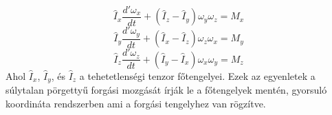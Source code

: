 \documentclass[../main.tex]{subfiles}
\begin{document}
\begin{equation}
    \hat{I}_x \frac{d'\omega_x}{dt} + (\hat{I}_z - \hat{I}_y) \omega_y \omega_z = M_x
\end{equation}
\begin{equation}
    \hat{I}_y \frac{d'\omega_y}{dt} + (\hat{I}_x - \hat{I}_z) \omega_z \omega_x = M_y
\end{equation}
\begin{equation}
    \hat{I}_z \frac{d'\omega_z}{dt} + (\hat{I}_y - \hat{I}_x) \omega_x \omega_y = M_z
\end{equation}
Ahol $\hat{I}_x$, $\hat{I}_y$, és $\hat{I}_z$ a tehetetlenségi tenzor főtengelyei. Ezek az egyenletek a súlytalan pörgettyű forgási mozgását írják le a főtengelyek mentén, gyorsuló koordináta rendszerben ami a forgási tengelyhez van rögzítve.
\end{document}
